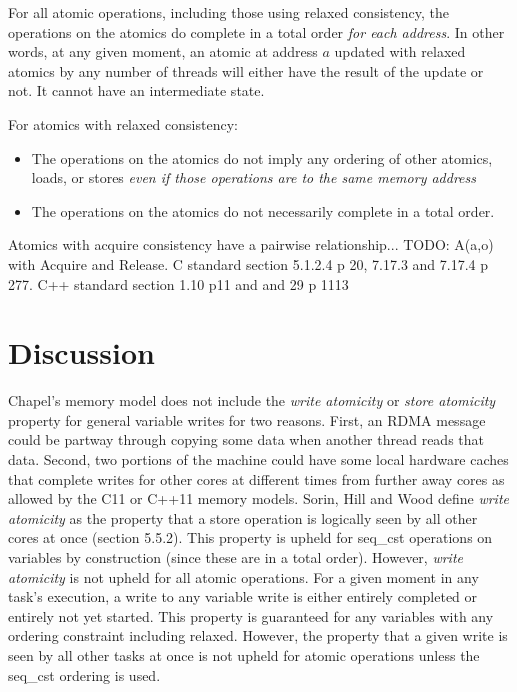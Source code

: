 For all atomic operations, including those using relaxed consistency, the
operations on the atomics do complete in a total order \textit{for each
address}.  In other words, at any given moment, an atomic at address $a$
updated with relaxed atomics by any number of threads will either have the
result of the update or not. It cannot have an intermediate state.

For atomics with relaxed consistency:
\begin{itemize}

  \item The operations on the atomics do not imply any ordering of other
  atomics, loads, or stores \textit{even if those operations are to the same
  memory address}

  \item The operations on the atomics do not necessarily complete in a total
  order.

\end{itemize}

Atomics with acquire consistency have a pairwise relationship...
TODO: A(a,o) with Acquire and Release. C standard section 5.1.2.4 p 20, 7.17.3 and 7.17.4 p 277. C++ standard section 1.10 p11 and and 29 p 1113

\section{Discussion}

Chapel's memory model does not include the \textit{write atomicity} or
\textit{store atomicity} property for general variable writes for two reasons.
First, an RDMA message could be partway through copying some data when another
thread reads that data. Second, two portions of the machine could have some
local hardware caches that complete writes for other cores at different times
from further away cores as allowed by the C11 or C++11 memory models. Sorin,
Hill and Wood define \textit{write atomicity} as the property that a store
operation is logically seen by all other cores at once (section 5.5.2). This
property is upheld for seq\_cst operations on  variables by
construction (since these are in a total order). However, \textit{write
atomicity} is not upheld for all atomic operations. For a given moment in any
task's execution, a write to any  variable write is either
entirely completed or entirely not yet started. This property is guaranteed for
any  variables with any ordering constraint including relaxed.
However, the property that a given write is seen by all other tasks at once is
not upheld for atomic operations unless the seq\_cst ordering is used.

